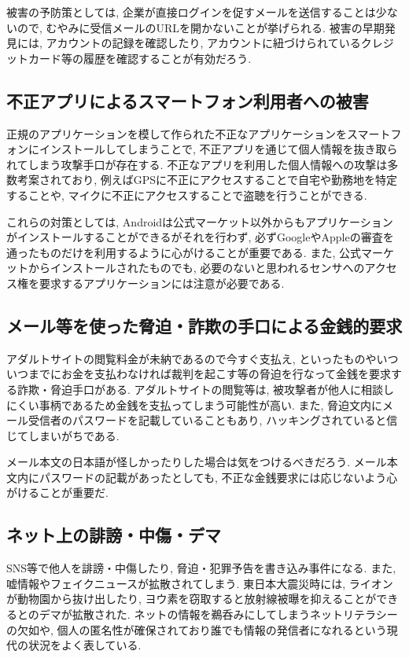 \documentclass{jsarticle}
\begin{document}
被害の予防策としては, 企業が直接ログインを促すメールを送信することは少ないので, むやみに受信メールのURLを開かないことが挙げられる. 被害の早期発見には, アカウントの記録を確認したり, アカウントに紐づけられているクレジットカード等の履歴を確認することが有効だろう. 

\subsection{不正アプリによるスマートフォン利用者への被害}
正規のアプリケーションを模して作られた不正なアプリケーションをスマートフォンにインストールしてしまうことで, 不正アプリを通じて個人情報を抜き取られてしまう攻撃手口が存在する. 不正なアプリを利用した個人情報への攻撃は多数考案されており, 例えばGPSに不正にアクセスすることで自宅や勤務地を特定することや, マイクに不正にアクセスすることで盗聴を行うことができる.

これらの対策としては, Androidは公式マーケット以外からもアプリケーションがインストールすることができるがそれを行わず, 必ずGoogleやAppleの審査を通ったものだけを利用するように心がけることが重要である. また, 公式マーケットからインストールされたものでも, 必要のないと思われるセンサへのアクセス権を要求するアプリケーションには注意が必要である.

\subsection{メール等を使った脅迫・詐欺の手口による金銭的要求}
アダルトサイトの閲覧料金が未納であるので今すぐ支払え, といったものやいついつまでにお金を支払わなければ裁判を起こす等の脅迫を行なって金銭を要求する詐欺・脅迫手口がある. アダルトサイトの閲覧等は, 被攻撃者が他人に相談しにくい事柄であるため金銭を支払ってしまう可能性が高い. また, 脅迫文内にメール受信者のパスワードを記載していることもあり, ハッキングされていると信じてしまいがちである.

メール本文の日本語が怪しかったりした場合は気をつけるべきだろう. メール本文内にパスワードの記載があったとしても, 不正な金銭要求には応じないよう心がけることが重要だ.

\subsection{ネット上の誹謗・中傷・デマ}
SNS等で他人を誹謗・中傷したり, 脅迫・犯罪予告を書き込み事件になる. また, 嘘情報やフェイクニュースが拡散されてしまう. 東日本大震災時には, ライオンが動物園から抜け出したり, ヨウ素を窃取すると放射線被曝を抑えることができるとのデマが拡散された. ネットの情報を鵜呑みにしてしまうネットリテラシーの欠如や, 個人の匿名性が確保されており誰でも情報の発信者になれるという現代の状況をよく表している.
\end{document}
